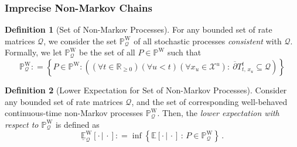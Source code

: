 \documentclass[10pt]{paper}
\theoremstyle{definition}
\newtheorem{definition}{Definition}
\newcommand{\reals}{\mathbb{R}}
\newcommand{\realspos}{\reals_{>0}}
\newcommand{\realsnonneg}{\reals_{\geq 0}}
\newcommand{\states}{\mathcal{X}}
\newcommand{\processes}{\mathbb{P}}
\newcommand{\wprocesses}{\processes^{\mathrm{W}}}
\newcommand{\gambles}{\mathcal{L}}
\newcommand{\rateset}{\mathcal{Q}}
\newcommand{\norm}[1]{\left\lVert #1 \right\rVert}
\newcommand{\abs}[1]{\left\vert #1 \right\vert}
\newcommand{\coloneqq}{:\!=}
\begin{document}
\subsubsection{Imprecise Non-Markov Chains}

\begin{definition}[Set of Non-Markov Processes]\label{def:set_non_markov_process}
For any bounded set of rate matrices $\rateset$, we consider the set $\wprocesses_\rateset$ of all stochastic processes \emph{consistent} with $\rateset$. Formally, we let $\wprocesses_\rateset$ be the set of all $P\in\wprocesses$ such that
\begin{equation}
\label{def:nonmarkovsetQ}
\wprocesses_\rateset
\coloneqq
\left\{
P\in\wprocesses
\colon
\left((\forall t\in\realsnonneg)(\forall u<t)(\forall x_u\in\states^u):~
\overline{\partial}
{T^t_{t,\,x_u}}\subseteq\rateset
\right)\right\}
\end{equation}
\end{definition}

\begin{definition}[Lower Expectation for Set of Non-Markov Processes]\label{def:lower_non_markov} Consider any bounded set of rate matrices $\rateset$, and the set of corresponding well-behaved continuous-time non-Markov processes $\wprocesses_\rateset$. Then, the \emph{lower expectation with respect to $\wprocesses_\rateset$} is defined as
\begin{equation*}
\underline{\mathbb{E}}_\rateset^\mathrm{W}[\cdot\,\vert\,\cdot] \coloneqq \inf\left\{\mathbb{E}[\cdot\,\vert\,\cdot]\,:\,P\in\wprocesses_\rateset\right\}\,.
\end{equation*}
\end{definition}
\end{document}
